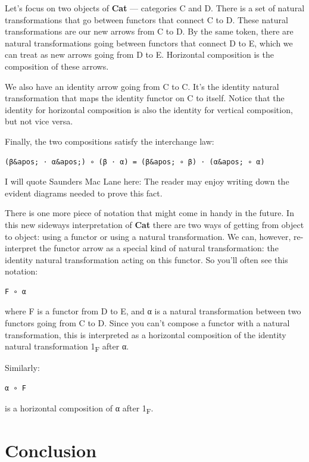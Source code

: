Let's focus on two objects of \textbf{Cat} --- categories C and D. There
is a set of natural transformations that go between functors that
connect C to D. These natural transformations are our new arrows from C
to D. By the same token, there are natural transformations going between
functors that connect D to E, which we can treat as new arrows going
from D to E. Horizontal composition is the composition of these arrows.

We also have an identity arrow going from C to C. It's the identity
natural transformation that maps the identity functor on C to itself.
Notice that the identity for horizontal composition is also the identity
for vertical composition, but not vice versa.

Finally, the two compositions satisfy the interchange law:

\begin{verbatim}
(β&apos; ⋅ α&apos;) ∘ (β ⋅ α) = (β&apos; ∘ β) ⋅ (α&apos; ∘ α)
\end{verbatim}

I will quote Saunders Mac Lane here: The reader may enjoy writing down
the evident diagrams needed to prove this fact.

There is one more piece of notation that might come in handy in the
future. In this new sideways interpretation of \textbf{Cat} there are
two ways of getting from object to object: using a functor or using a
natural transformation. We can, however, re-interpret the functor arrow
as a special kind of natural transformation: the identity natural
transformation acting on this functor. So you'll often see this
notation:

\begin{verbatim}
F ∘ α
\end{verbatim}

where F is a functor from D to E, and α is a natural transformation
between two functors going from C to D. Since you can't compose a
functor with a natural transformation, this is interpreted as a
horizontal composition of the identity natural transformation
1\textsubscript{F} after α.

Similarly:

\begin{verbatim}
α ∘ F
\end{verbatim}

is a horizontal composition of α after 1\textsubscript{F}.

\section{Conclusion}\label{conclusion}

